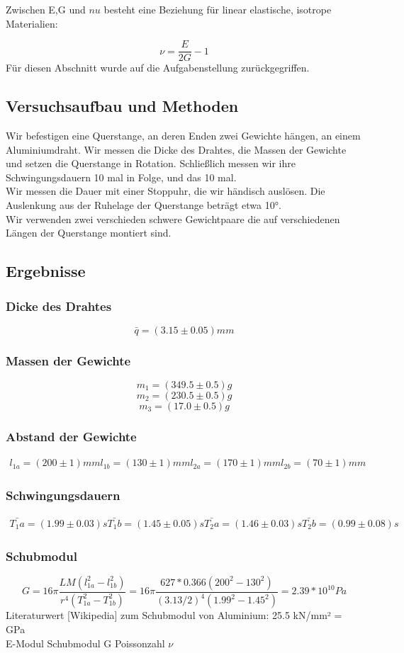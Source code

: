 \documentclass{article}
\begin{document}
Zwischen E,G und $nu$ besteht eine Beziehung für linear elastische, isotrope Materialien:

$$\nu = \frac{E}{2G} -1$$
Für diesen Abschnitt wurde auf die Aufgabenstellung zurückgegriffen.
\subsection{Versuchsaufbau und Methoden}
Wir befestigen eine Querstange, an deren Enden zwei Gewichte hängen, an einem Aluminiumdraht. Wir messen die Dicke des Drahtes, die Massen der Gewichte und setzen die Querstange in Rotation. Schließlich messen wir ihre Schwingungsdauern 10 mal in Folge, und das 10 mal. \\
Wir messen die Dauer mit einer Stoppuhr, die wir händisch auslösen. Die Auslenkung aus der Ruhelage der Querstange beträgt etwa 10°. \\
Wir verwenden zwei verschieden schwere Gewichtpaare die auf verschiedenen Längen der Querstange montiert sind.
\subsection{Ergebnisse}
\subsubsection*{Dicke des Drahtes}
$$\bar{q}=(3.15 \pm 0.05)mm$$ 
\subsubsection*{Massen der Gewichte}
$$m_1=(349.5 \pm 0.5)g$$
$$m_2=(230.5 \pm 0.5)g$$
$$m_3=(17.0 \pm 0.5)g$$
\subsubsection*{Abstand der Gewichte}
\begin{gather*}
l_{1a}=(200 \pm 1)mm
l_{1b}=(130 \pm 1)mm
l_{2a}=(170 \pm 1)mm
l_{2b}=(70 \pm 1)mm
\end{gather*}
\subsubsection*{Schwingungsdauern}
\begin{gather*}
\bar{T_1a}=(1.99 \pm 0.03)s
\bar{T_1b}=(1.45 \pm 0.05)s
\bar{T_2a}=(1.46 \pm 0.03)s
\bar{T_2b}=(0.99 \pm 0.08)s
\end{gather*}
\subsubsection*{Schubmodul}
\begin{equation}
\label{Gfinal}
G=16\pi\frac{LM(l_{1a}^2-l_{1b}^2)}{r^4(T_{1a}^2-T_{1b}^2)}=16\pi\frac{627*0.366(200^2-130^2)}{(3.13/2)^4(1.99^2-1.45^2)}=2.39*10^{10} Pa
\end{equation} 
Literaturwert [Wikipedia] zum Schubmodul von Aluminium: 25.5 kN/mm² = GPa\\
E-Modul
Schubmodul G
Poissonzahl $\nu$
\end{document}

